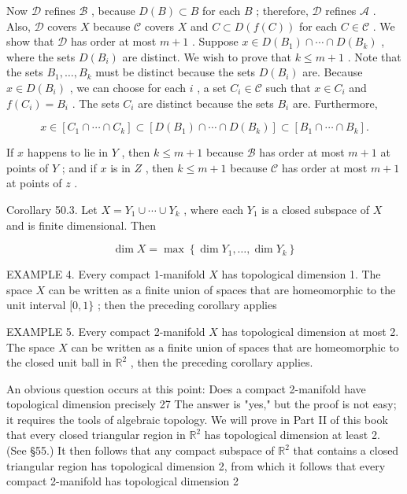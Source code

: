 Now \(\mathcal{D}\) refines \(\mathcal{B}\) , because \(D\left( B\right)  \subset  B\) for each \(B\) ; therefore, \(\mathcal{D}\) refines \(\mathcal{A}\) . Also, \(\mathcal{D}\) covers \(X\) because \(\mathcal{C}\) covers \(X\) and \(C \subset  D\left( {f\left( C\right) }\right)\) for each \(C \in  \mathcal{C}\) . We show that \(\mathcal{D}\) has order at most \(m + 1\) . Suppose \(x \in  D\left( {B}_{1}\right)  \cap  \cdots  \cap  D\left( {B}_{k}\right)\) , where the sets \(D\left( {B}_{i}\right)\) are distinct. We wish to prove that \(k \leq  m + 1\) . Note that the sets \({B}_{1},\ldots ,{B}_{k}\) must be distinct because the sets \(D\left( {B}_{i}\right)\) are. Because \(x \in  D\left( {B}_{i}\right)\) , we can choose for each \(i\) , a set \({C}_{i} \in  \mathcal{C}\) such that \(x \in  {C}_{i}\) and \(f\left( {C}_{i}\right)  = {B}_{i}\) . The sets \({C}_{i}\) are distinct because the sets \({B}_{i}\) are. Furthermore,

\[
x \in  \left\lbrack  {{C}_{1} \cap  \cdots  \cap  {C}_{k}}\right\rbrack   \subset  \left\lbrack  {D\left( {B}_{1}\right)  \cap  \cdots  \cap  D\left( {B}_{k}\right) }\right\rbrack   \subset  \left\lbrack  {{B}_{1} \cap  \cdots  \cap  {B}_{k}}\right\rbrack  .
\]

If \(x\) happens to lie in \(Y\) , then \(k \leq  m + 1\) because \(\mathcal{B}\) has order at most \(m + 1\) at points of \(Y\) ; and if \(x\) is in \(Z\) , then \(k \leq  m + 1\) because \(\mathcal{C}\) has order at most \(m + 1\) at points of \(z\) .

Corollary 50.3. Let \(X = {Y}_{1} \cup  \cdots  \cup  {Y}_{k}\) , where each \({Y}_{1}\) is a closed subspace of \(X\) and is finite dimensional. Then

\[
\dim X = \max \left\{  {\dim {Y}_{1},\ldots ,\dim {Y}_{k}}\right\}
\]

EXAMPLE 4. Every compact 1-manifold \(X\) has topological dimension 1. The space \(X\) can be written as a finite union of spaces that are homeomorphic to the unit interval \(\lbrack 0,1\}\) ; then the preceding corollary applies

EXAMPLE 5. Every compact 2-manifold \(X\) has topological dimension at most 2. The space \(X\) can be written as a finite union of spaces that are homeomorphic to the closed unit ball in \({\mathbb{R}}^{2}\) , then the preceding corollary applies.

An obvious question occurs at this point: Does a compact 2-manifold have topological dimension precisely 27 The answer is "yes," but the proof is not easy; it requires the tools of algebraic topology. We will prove in Part II of this book that every closed triangular region in \({\mathbb{R}}^{2}\) has topological dimension at least 2. (See §55.) It then follows that any compact subspace of \({\mathbb{R}}^{2}\) that contains a closed triangular region has topological dimension 2, from which it follows that every compact 2-manifold has topological dimension 2


